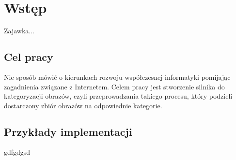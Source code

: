 \chapter*{Wstęp}
Zajawka...

\section*{Cel pracy}
Nie sposób mówić o kierunkach rozwoju współczesnej informatyki pomijając zagadnienia związane z Internetem.
Celem pracy jest stworzenie silnika do kategoryzacji obrazów, czyli przeprowadzania takiego procesu, który podzieli dostarczony zbiór obrazów na odpowiednie kategorie.

\section*{Przykłady implementacji}
gdfgdgsd